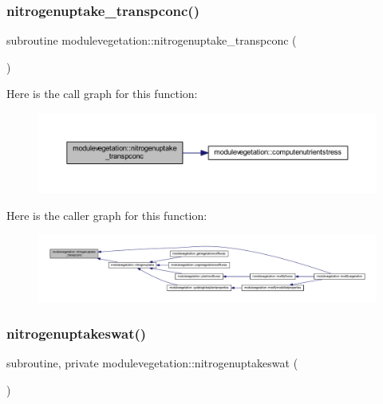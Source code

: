 \subsubsection{\texorpdfstring{nitrogenuptake\+\_\+transpconc()}{nitrogenuptake\_transpconc()}}
{\footnotesize\ttfamily subroutine modulevegetation\+::nitrogenuptake\+\_\+transpconc (\begin{DoxyParamCaption}{ }\end{DoxyParamCaption})\hspace{0.3cm}{\ttfamily [private]}}

Here is the call graph for this function\+:\nopagebreak
\begin{figure}[H]
\begin{center}
\leavevmode
\includegraphics[width=350pt]{namespacemodulevegetation_a1a53d3932ef020aaa3e0656050c15ee3_cgraph}
\end{center}
\end{figure}
Here is the caller graph for this function\+:\nopagebreak
\begin{figure}[H]
\begin{center}
\leavevmode
\includegraphics[width=350pt]{namespacemodulevegetation_a1a53d3932ef020aaa3e0656050c15ee3_icgraph}
\end{center}
\end{figure}
\mbox{\label{namespacemodulevegetation_a5c30bda27fd79a69f45cc6fd35a2f0af}} 
\subsubsection{\texorpdfstring{nitrogenuptakeswat()}{nitrogenuptakeswat()}}
{\footnotesize\ttfamily subroutine, private modulevegetation\+::nitrogenuptakeswat (\begin{DoxyParamCaption}{ }\end{DoxyParamCaption})\hspace{0.3cm}{\ttfamily [private]}}

